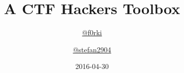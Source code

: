 \documentclass[english,xcolor={x11names,svgnames,dvipsnames}]{beamer}
\author{\href{https://twitter.com/f0rki}{@f0rki} \and \href{https://twitter.com/stefan2904}{@stefan2904}}
\title{A CTF Hackers Toolbox}
\subtitle{}
\date{2016-04-30}
\begin{document}
\begin{frame}[t,plain]
    \titlepage
\end{frame}


\end{document}
